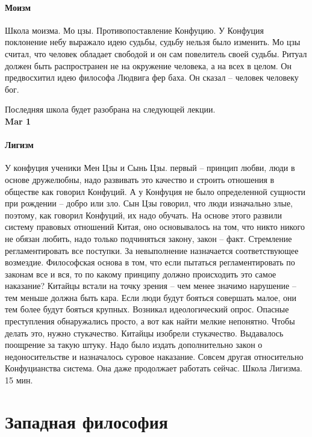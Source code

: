 \documentclass[a4paper, 12pt]{article}
\begin{document}
\paragraph{Моизм}
Школа моизма. Мо цзы. Противопоставление Конфуцию. У Конфуция поклонение небу выражало идею судьбы, судьбу нельзя было изменить. Мо цзы считал, что человек обладает свободой и он сам повелитель своей судьбы. Ритуал должен быть распространен не на окружение человека, а на всех в целом. Он предвосхитил идею философа Людвига фер баха. Он сказал -- человек человеку бог. 

Последняя школа будет разобрана на следующей лекции. 
\\

\hfill \textbf{Mar 1}

\paragraph{Лигизм} 

У конфуция ученики Мен Цзы и Сынь Цзы. первый -- принцип любви, люди в основе дружелюбны, надо развивать это качество и строить отношения в обществе как говорил Конфуций. А у Конфуция не было определенной сущности при рождении -- добро или зло. Сын Цзы говорил, что люди изначально злые, поэтому, как говорил Конфуций, их надо обучать. На основе этого развили систему правовых отношений Китая, оно основывалось на том, что никто никого не обязан любить, надо только подчиняться закону, закон -- факт. Стремление регламентировать все поступки. За невыполнение назначается соответствующее возмездие. Философская основа в том, что если пытаться регламентировать по законам все и вся, то по какому принципу должно происходить это самое наказание? Китайцы встали на точку зрения -- чем менее значимо нарушение -- тем меньше должна быть кара. Если люди будут бояться совершать малое, они тем более будут бояться крупных. Возникал идеологический опрос. Опасные преступления обнаружались просто, а вот как найти мелкие непонятно. Чтобы делать это, нужно стукачество. Китайцы изобрели стукачество. Выдавалось поощрение за такую штуку. Надо было издать дополнительно закон о недоносительстве и назначалось суровое наказание. Совсем другая относительно Конфуцианства система. Она даже продолжает работать сейчас. Школа Лигизма. 15 мин.


\section{Западная философия}
\end{document}
